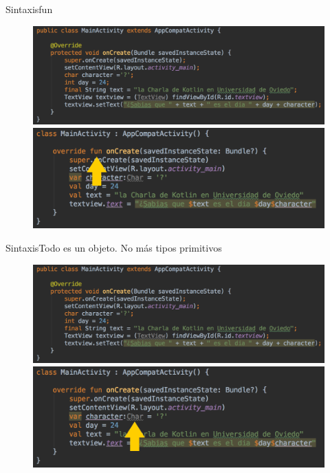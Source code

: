 \begin{frame}{Sintaxis}{fun}
    \begin{figure}[h]
    \centering
    \includegraphics[width=\textwidth]{images/kotlin_vs_java/java_basic}
    \vspace{0pt}
    \includegraphics[width=\textwidth]{images/kotlin_vs_java/kotlin_fun}
    \end{figure}
\end{frame}

\begin{frame}{Sintaxis}{Todo es un objeto. No más tipos primitivos}
    \begin{figure}[h]
    \centering
    \includegraphics[width=\textwidth]{images/kotlin_vs_java/java_basic}
    \vspace{0pt}
    \includegraphics[width=\textwidth]{images/kotlin_vs_java/kotlin_primitives}
    \end{figure}
\end{frame}

